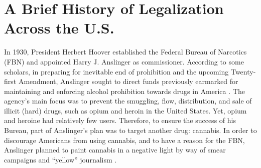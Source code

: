 



%

%


\section{A Brief History of Legalization Across the U.S.}

In 1930, President Herbert Hoover established the Federal Bureau of Narcotics (FBN) and appointed Harry J. Anslinger as commissioner. According to some scholars, in preparing for inevitable end of prohibition and the upcoming Twenty-first Amendment, Anslinger sought to direct funds previously earmarked for maintaining and enforcing alcohol prohibition towards drugs in America \citep{hari_2015}. The agency's main focus was to prevent the smuggling, flow, distribution, and sale of illicit (hard) drugs, such as opium and heroin in the United States. Yet, opium and heroine had relatively few users. Therefore, to ensure the success of his Bureau, part of Anslinger's plan was to target another drug: cannabis. In order to discourage Americans from using cannabis, and to have a reason for the FBN, Anslinger planned to paint cannabis in a negative light by way of smear campaigns and ``yellow'' journalism \citep{mosher_and_akins_2019,newhart_and_dolphin_2018,rosenthal_and_kubby_1996}. 

